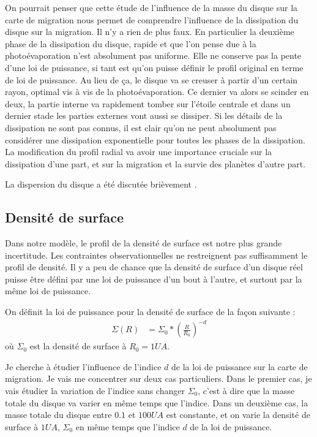 On pourrait penser que cette étude de l'influence de la masse du disque sur la carte de migration nous permet de comprendre l'influence de la dissipation du disque sur la migration. Il n'y a rien de plus faux. En particulier la deuxième phase de la dissipation du disque, rapide et que l'on pense due à la photoévaporation n'est absolument pas uniforme. Elle ne conserve pas la pente d'une loi de puissance, si tant est qu'on puisse définir le profil original en terme de loi de puissance. Au lieu de ça, le disque va se creuser à partir d'un certain rayon, optimal vis à vis de la photoévaporation. Ce dernier va alors se scinder en deux, la partie interne va rapidement tomber sur l'étoile centrale et dans un dernier stade les parties externes vont aussi se dissiper. Si les détails de la dissipation ne sont pas connus, il est clair qu'on ne peut absolument pas considérer une dissipation exponentielle pour toutes les phases de la dissipation. La modification du profil radial va avoir une importance cruciale sur la dissipation d'une part, et sur la migration et la survie des planètes d'autre part. 

La dispersion du disque a été discutée brièvement .

\subsection{Densité de surface}
Dans notre modèle, le profil de la densité de surface est notre plus grande incertitude. Les contraintes observationnelles ne restreignent pas suffisamment le profil de densité. Il y a peu de chance que la densité de surface d'un disque réel puisse être défini par une loi de puissance d'un bout à l'autre, et surtout par la même loi de puissance. 

On définit la loi de puissance pour la densité de surface de la façon suivante : 
\begin{align}
\Sigma(R) &= \Sigma_0 * \left(\frac{R}{R_0}\right)^{-d}
\end{align}
où $\Sigma_0$ est la densité de surface à $R_0=1\unit{UA}$.

Je cherche à étudier l'influence de l'indice $d$ de la loi de puissance sur la carte de migration. Je vais me concentrer sur deux cas particuliers. Dans le premier cas, je vais étudier la variation de l'indice sans changer $\Sigma_0$, c'est à dire que la masse totale du disque va varier en même temps que l'indice. Dans un deuxième cas, la masse totale du disque entre $0.1$ et $100\unit{UA}$ est constante, et on varie la densité de surface à $1\unit{UA}$, $\Sigma_0$ en même temps que l'indice $d$ de la loi de puissance.

